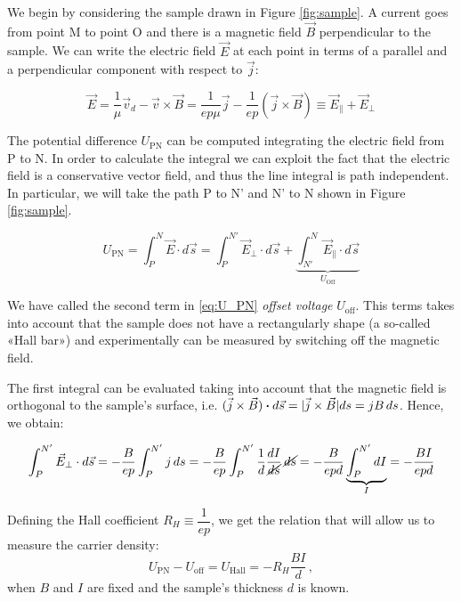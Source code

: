 \documentclass[11pt,a4paper]{article}
\begin{document}
We begin by considering the sample drawn in Figure \ref{fig:sample}. A current goes from point M to point O and there is a magnetic field $\vec{B}$ perpendicular to the sample. We can write the electric field $\vec{E}$ at each point in terms of a parallel and a perpendicular component with respect to $\vec{j}$:

\begin{equation}\label{eq:E_field}
\vec{E}=\frac{1}{\mu}\vec{v}_d-\vec{v}\times\vec{B}=\frac{1}{ep\mu}\vec{j}-\frac{1}{ep}\left(\vec{j}\times\vec{B}\right)\equiv\vec{E}_\parallel + \vec{E}_\perp
\end{equation}

The potential difference $U_\text{PN}$ can be computed integrating the electric field from P to N. In order to calculate the integral we can exploit the fact that the electric field is a conservative vector field, and thus the line integral is path independent. In particular, we will take the path P to N' and N' to N shown in Figure \ref{fig:sample}.

\begin{equation}\label{eq:U_PN}
U_\text{PN}=\int_P^N\vec{E}\cdot d\vec{s}=\int_P^{N'}\vec{E}_\perp\cdot d\vec{s}+\underbrace{\int_{N'}^N\vec{E}_\parallel\cdot d\vec{s}}_{U_\text{Off}}
\end{equation}

We have called the second term in \eqref{eq:U_PN} \emph{offset voltage} $U_\text{off}$. This terms takes into account that the sample does not have a rectangularly shape (a so-called «Hall bar») and experimentally can be measured by switching off the magnetic field.

The first integral can be evaluated taking into account that the magnetic field is orthogonal to the sample's surface, i.e. $(\vec{j}\times\vec{B})\vdot d\vec{s}=|\vec{j}\times\vec{B}|ds=jB\,ds$. Hence, we obtain:

\begin{equation}
\int_P^{N'}\vec{E}_\perp\cdot d\vec{s}=-\frac{B}{ep}\int_P^{N'}j\, ds=-\frac{B}{ep}\int_P^{N'}\frac{1}{d}\frac{dI}{\cancel{ds}}\, \cancel{ds}=-\frac{B}{epd}\underbrace{\int_P^{N'} dI}_I=-\frac{BI}{epd}
\end{equation}

Defining the Hall coefficient $R_H\equiv\dfrac{1}{ep}$, we get the relation that will allow us to measure the carrier density:
\begin{equation}\label{eq:Hall_voltage}
U_\text{PN}-U_\text{off}=U_\text{Hall}=-R_H\frac{BI}{d}\,,
\end{equation}
when $B$ and $I$ are fixed and the sample's thickness $d$ is known.
\end{document}
